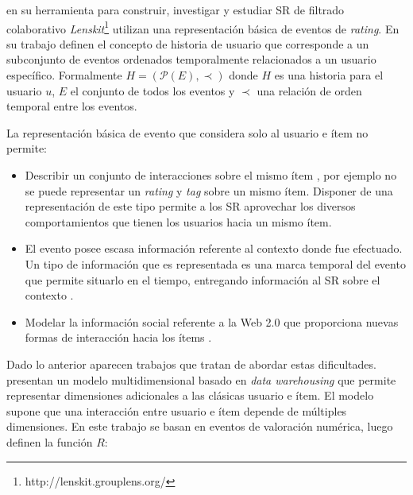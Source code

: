 \cite{Ekstrand:2011} en su herramienta para construir, investigar y estudiar SR de filtrado colaborativo \textit{Lenskit}\footnote{http://lenskit.grouplens.org/} utilizan una representación básica de eventos de  \textit{rating}. En su trabajo definen el concepto de historia de usuario que corresponde a un subconjunto de eventos ordenados temporalmente relacionados a un usuario específico. Formalmente $H=(\mathcal{P}(E), \prec)$ donde $H$ es una historia para el usuario $u$, $E$ el conjunto de todos los eventos y $\prec$ una relación de orden temporal entre los eventos.

La representación básica de evento que considera solo al usuario e ítem no permite:
\begin{itemize}
	\item Describir un conjunto de interacciones sobre el mismo ítem \citep{Babar:2010}, por ejemplo no se puede representar un \textit{rating} y \textit{tag} sobre un mismo ítem. Disponer de una representación de este tipo permite a los SR aprovechar los diversos comportamientos que tienen los usuarios hacia un mismo ítem.
	\item El evento posee escasa información referente al contexto donde fue efectuado. Un tipo de información que es representada es una marca temporal del evento que permite situarlo en el tiempo, entregando información al SR sobre el contexto \citep{Adomavicius:2011}.
	\item Modelar la información social referente a la Web 2.0 que proporciona nuevas formas de interacción hacia los ítems \citep{Bobadilla:2013}.
\end{itemize}



Dado lo anterior aparecen trabajos que tratan de abordar estas dificultades. \cite{Adomavicius:2001} presentan un modelo multidimensional basado en \textit{data warehousing} que permite representar dimensiones adicionales a las clásicas usuario e ítem. El modelo supone que una interacción entre usuario e ítem depende de múltiples dimensiones. En este trabajo se basan en eventos de valoración numérica, luego definen la función $R$:

